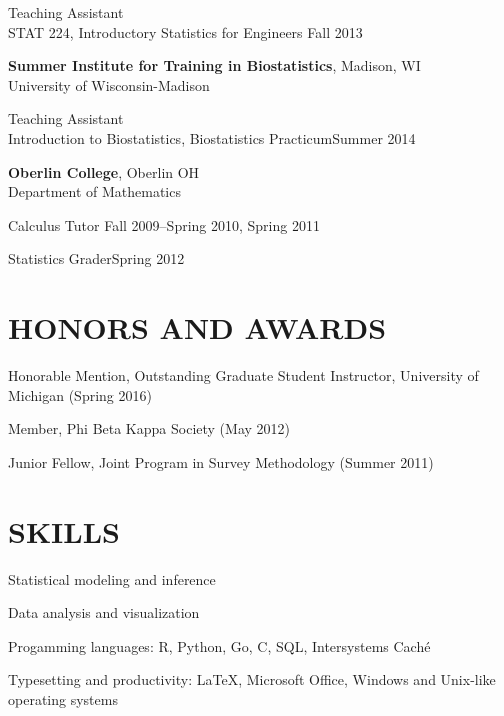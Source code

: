 \documentclass[letterpaper, 11pt]{article}
\begin{document}
\hspace{15pt}Teaching Assistant\\
\hspace{15pt}STAT 224, Introductory Statistics for Engineers \hfill Fall 2013

\vspace{6pt}
{\bf Summer Institute for Training in Biostatistics}, Madison, WI\\
University of Wisconsin-Madison

\hspace{15pt}Teaching Assistant\\
\hspace{15pt}Introduction to Biostatistics, Biostatistics Practicum\hfill Summer 2014

\vspace{6pt}
{\bf Oberlin College}, Oberlin OH\\
Department of Mathematics

\hspace{15pt}Calculus Tutor \hfill Fall 2009--Spring 2010, Spring 2011

\hspace{15pt}Statistics Grader\hfill Spring 2012

\vspace{18pt}
\section{HONORS AND AWARDS}          
Honorable Mention, Outstanding Graduate Student Instructor, University of Michigan (Spring 2016)

Member, Phi Beta Kappa Society (May 2012)

Junior Fellow, Joint Program in Survey Methodology (Summer 2011)
   
\section{SKILLS}
Statistical modeling and inference

Data analysis and visualization

Progamming languages:  R, Python, Go, C, SQL, Intersystems Cach\'{e}

Typesetting and productivity:  \LaTeX, Microsoft Office, Windows and Unix-like operating systems

\label{sec:lastpage}
\end{document}
